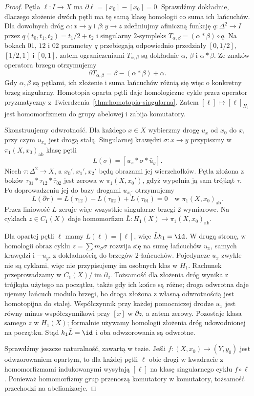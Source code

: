 \begin{proof}
Pętla $\ell:I\to X$ ma
$\partial\ell=[x_0]-[x_0]=0$.
Sprawdźmy dokładnie, dlaczego złożenie dwóch pętli
ma tę samą klasę homologii co suma ich łańcuchów.
Dla dowolnych dróg $\alpha:x\to y$ i $\beta:y\to z$
zdefiniujmy afiniczną funkcję
$q:\Delta^2\to I$ przez
$q(t_0,t_1,t_2)=t_1/2+t_2$
i singularny $2$-sympleks
$T_{\alpha,\beta}=(\alpha*\beta)\circ q$.
Na bokach $01$, $12$ i $02$ parametry $q$
przebiegają odpowiednio przedziały
$[0,1/2]$, $[1/2,1]$ i $[0,1]$,
zatem ograniczeniami $T_{\alpha,\beta}$
są dokładnie $\alpha$, $\beta$ i $\alpha*\beta$.
Ze znaków operatora brzegu otrzymujemy
\[
 \partial T_{\alpha,\beta}
 =\beta-(\alpha*\beta)+\alpha.
\]
Gdy $\alpha,\beta$ są pętlami,
ich złożenie i suma łańcuchów
różnią się więc o konkretny brzeg singularny.
Homotopia oparta pętli daje homologiczne cykle przez operator pryzmatyczny
z Twierdzenia~\ref{thm:homotopia-singularna}.
Zatem $[\ell]\mapsto
[\ell]_{H_1}$ jest
homomorfizmem do grupy
abelowej i zabija komutatory.

Skonstruujemy odwrotność.
Dla każdego $x\in X$
wybierzmy drogę $u_x$
od $x_0$ do $x$,
przy czym $u_{x_0}$
jest drogą stałą.
Singularnej krawędzi
$\sigma:x\to y$
przypiszmy w
$\pi_1(X,x_0)_{\mathrm{ab}}$
klasę pętli
\[
 L(\sigma)
 =[u_x*\sigma*\bar u_y].
\]
Niech $\tau:\Delta^2\to X$,
a $x_0',x_1',x_2'$
będą obrazami jej
wierzchołków.
Pętla złożona z boków
$\tau_{01}*\tau_{12}*
\bar\tau_{02}$ jest
zerowa w $\pi_1(X,x_0')$,
gdyż wypełnia ją
sam trójkąt $\tau$.
Po doprowadzeniu jej
do bazy drogami $u_{x_i'}$
otrzymujemy
\[
 L(\partial\tau)
 =L(\tau_{12})-L(\tau_{02})
  +L(\tau_{01})=0
 \quad\text{w }\pi_1(X,x_0)_{\mathrm{ab}}.
\]
Przez liniowość $L$
zeruje więc wszystkie
singularne brzegi
$2$-wymiarowe.
Na cyklach $z\in C_1(X)$
daje homomorfizm
$\bar L:H_1(X)\to
\pi_1(X,x_0)_{\mathrm{ab}}$.

Dla opartej pętli
$\ell$ mamy $L(\ell)=[\ell]$,
więc $\bar Lh_1=\id$.
W drugą stronę,
w homologii
obraz cyklu
$z=\sum m_\sigma\sigma$
rozwija się na
sumę łańcuchów $u_x$, samych krawędzi i $-u_y$,
z dokładnością do brzegów $2$-łańcuchów.
Pojedyncze $u_x$ zwykle nie są cyklami, więc nie przypisujemy
im osobnych klas w $H_1$. Rachunek przeprowadzamy w $C_1(X)/\operatorname{im}\partial_2$.
Tożsamość dla złożenia dróg wynika z trójkąta użytego na początku,
także gdy ich końce są różne; droga odwrotna daje ujemny łańcuch
modulo brzegi, bo droga złożona z własną odwrotnością jest homotopijna do stałej.
Współczynnik przy
każdej pomocniczej
drodze $u_x$ jest
równy minus współczynnikowi
przy $[x]$ w $\partial z$,
a zatem zerowy.
Pozostaje klasa
samego $z$ w $H_1(X)$;
formalnie używamy
homologii złożenia
dróg udowodnionej
na początku. Stąd
$h_1\bar L=\id$
i oba odwzorowania są
odwrotne.

Sprawdźmy jeszcze naturalność,
zawartą w tezie. Jeśli
$f:(X,x_0)\to(Y,y_0)$
jest odwzorowaniem opartym,
to dla każdej pętli $\ell$
obie drogi w kwadracie
z homomorfizmami indukowanymi
wysyłają $[\ell]$ na
klasę singularnego cyklu $f\circ\ell$.
Ponieważ homomorfizmy grup
przenoszą komutatory w komutatory,
tożsamość przechodzi na abelianizacje.
\end{proof}

